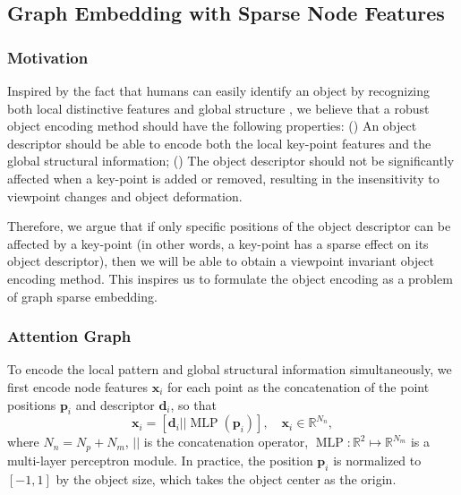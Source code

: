 \documentclass[letterpaper, 10 pt, journal, twoside]{IEEEtran}  %
\newcommand{\rom}[1]{\uppercase\expandafter{\romannumeral #1\relax}}
\newcommand{\fix}[1]{#1}
\begin{document}
\fix{
\subsection{Graph Embedding with Sparse Node Features}

\subsubsection{Motivation}\label{sec:motivation}

Inspired by the fact that humans can easily identify an object by recognizing both local distinctive features and global structure \cite{tarr2017concurrent}, we believe that a robust object encoding method should have the following properties: (\rom{1}) An object descriptor should be able to encode both the local key-point features and the global structural information; (\rom{2}) The object descriptor should not be significantly affected when a key-point is added or removed, resulting in the insensitivity to viewpoint changes and object deformation.

Therefore, we argue that if only specific positions of the object descriptor can be affected by a key-point (in other words, a key-point has a sparse effect on its object descriptor), then we will be able to obtain a viewpoint invariant object encoding method.
This inspires us to formulate the object encoding as a problem of graph sparse embedding.



\subsubsection{Attention Graph}\label{sec:node-encoding}

To encode the local pattern and global structural information simultaneously, we first encode node features $\mathbf{x}_i$ for each point as the concatenation of the point positions $\mathbf{p}_i$ and descriptor $\mathbf{d}_i$, so that
\begin{equation}\label{eq:node-feature}
   \mathbf{x}_i = [\mathbf{d}_i || \operatorname{MLP}(\mathbf{p}_i)], \quad \mathbf{x}_i \in \mathbb{R}^{N_n},
\end{equation}
where $N_n = N_p + N_m$, $||$ is the concatenation operator, $\operatorname{MLP}: \mathbb{R}^{2}\mapsto\mathbb{R}^{N_m}$ is a multi-layer perceptron module. In practice, the position $\mathbf{p}_i$ is normalized to $[-1,1]$ by the object size, which takes the object center as the origin.

}
\end{document}
